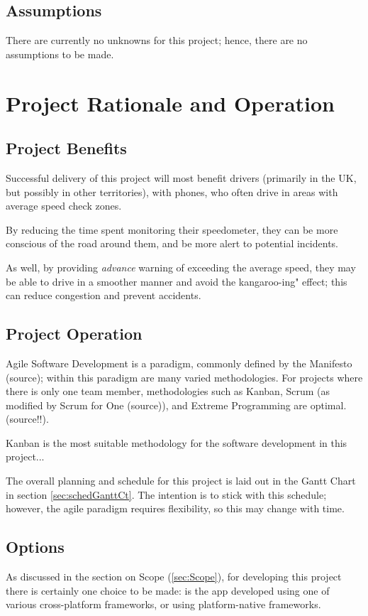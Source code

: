 \documentclass[11pt, a4paper, notitlepage]{report}
\begin{document}
\section{Assumptions}
There are currently no unknowns for this project; hence, there are no 
assumptions to be made.

\chapter{Project Rationale and Operation}
\section{Project Benefits}
Successful delivery of this project will most benefit drivers (primarily in the 
UK, but possibly in other territories), with phones, who often drive in areas 
with average speed check zones. 

By reducing the time spent monitoring their speedometer, they can be more 
conscious of the road around them, and be more alert to potential incidents.

As well, by providing \textit{advance} warning of exceeding the average speed, 
they may be able to drive in a smoother manner and avoid the kangaroo-ing" 
effect; this can reduce congestion and prevent accidents.

\section{Project Operation}\label{sec:projectOperation}
Agile Software Development is a paradigm, commonly defined by the Manifesto 
(source); within this paradigm are many varied methodologies. For projects 
where there is only one team member, methodologies such as Kanban, 
Scrum (as modified by Scrum for One (source)), and Extreme Programming are 
optimal. (source!!).

Kanban is the most suitable methodology for the software development in this 
project...%

The overall planning and schedule for this project is laid out in the Gantt 
Chart in section \ref{sec:schedGanttCt}. The intention is to stick with this 
schedule; however, the agile paradigm requires flexibility, so this may change 
with time.

\section{Options}
As discussed in the section on Scope (\ref{sec:Scope}), for developing this 
project there is certainly one choice to be made: is the app developed using 
one of various cross-platform frameworks, or using platform-native frameworks.
\end{document}
